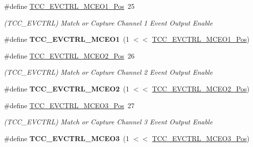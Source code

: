 \begin{DoxyCompactItemize}
\item 
\hypertarget{group___s_a_m_l21___t_c_c_gaf96f8b5df088326ebdd00e07f9ae3a99}{}\#define \hyperlink{group___s_a_m_l21___t_c_c_gaf96f8b5df088326ebdd00e07f9ae3a99}{T\+C\+C\+\_\+\+E\+V\+C\+T\+R\+L\+\_\+\+M\+C\+E\+O1\+\_\+\+Pos}~25\label{group___s_a_m_l21___t_c_c_gaf96f8b5df088326ebdd00e07f9ae3a99}

\begin{DoxyCompactList}\small\item\em (T\+C\+C\+\_\+\+E\+V\+C\+T\+R\+L) Match or Capture Channel 1 Event Output Enable \end{DoxyCompactList}\item 
\hypertarget{group___s_a_m_l21___t_c_c_ga35f063b20a3a6f184794e198ddb3e587}{}\#define {\bfseries T\+C\+C\+\_\+\+E\+V\+C\+T\+R\+L\+\_\+\+M\+C\+E\+O1}~(1 $<$$<$ \hyperlink{group___s_a_m_l21___t_c_c_gaf96f8b5df088326ebdd00e07f9ae3a99}{T\+C\+C\+\_\+\+E\+V\+C\+T\+R\+L\+\_\+\+M\+C\+E\+O1\+\_\+\+Pos})\label{group___s_a_m_l21___t_c_c_ga35f063b20a3a6f184794e198ddb3e587}

\item 
\hypertarget{group___s_a_m_l21___t_c_c_gaed199e4b713c8916817ea083460d28a7}{}\#define \hyperlink{group___s_a_m_l21___t_c_c_gaed199e4b713c8916817ea083460d28a7}{T\+C\+C\+\_\+\+E\+V\+C\+T\+R\+L\+\_\+\+M\+C\+E\+O2\+\_\+\+Pos}~26\label{group___s_a_m_l21___t_c_c_gaed199e4b713c8916817ea083460d28a7}

\begin{DoxyCompactList}\small\item\em (T\+C\+C\+\_\+\+E\+V\+C\+T\+R\+L) Match or Capture Channel 2 Event Output Enable \end{DoxyCompactList}\item 
\hypertarget{group___s_a_m_l21___t_c_c_ga15098087f2ba23fbb0f3982f71a74e1a}{}\#define {\bfseries T\+C\+C\+\_\+\+E\+V\+C\+T\+R\+L\+\_\+\+M\+C\+E\+O2}~(1 $<$$<$ \hyperlink{group___s_a_m_l21___t_c_c_gaed199e4b713c8916817ea083460d28a7}{T\+C\+C\+\_\+\+E\+V\+C\+T\+R\+L\+\_\+\+M\+C\+E\+O2\+\_\+\+Pos})\label{group___s_a_m_l21___t_c_c_ga15098087f2ba23fbb0f3982f71a74e1a}

\item 
\hypertarget{group___s_a_m_l21___t_c_c_gad3fe3f5bfd609f92010a7fa14cffca8b}{}\#define \hyperlink{group___s_a_m_l21___t_c_c_gad3fe3f5bfd609f92010a7fa14cffca8b}{T\+C\+C\+\_\+\+E\+V\+C\+T\+R\+L\+\_\+\+M\+C\+E\+O3\+\_\+\+Pos}~27\label{group___s_a_m_l21___t_c_c_gad3fe3f5bfd609f92010a7fa14cffca8b}

\begin{DoxyCompactList}\small\item\em (T\+C\+C\+\_\+\+E\+V\+C\+T\+R\+L) Match or Capture Channel 3 Event Output Enable \end{DoxyCompactList}\item 
\hypertarget{group___s_a_m_l21___t_c_c_gab15d27a9d9af8adcb7a0e6f7c266d399}{}\#define {\bfseries T\+C\+C\+\_\+\+E\+V\+C\+T\+R\+L\+\_\+\+M\+C\+E\+O3}~(1 $<$$<$ \hyperlink{group___s_a_m_l21___t_c_c_gad3fe3f5bfd609f92010a7fa14cffca8b}{T\+C\+C\+\_\+\+E\+V\+C\+T\+R\+L\+\_\+\+M\+C\+E\+O3\+\_\+\+Pos})\label{group___s_a_m_l21___t_c_c_gab15d27a9d9af8adcb7a0e6f7c266d399}


\end{DoxyCompactItemize}
